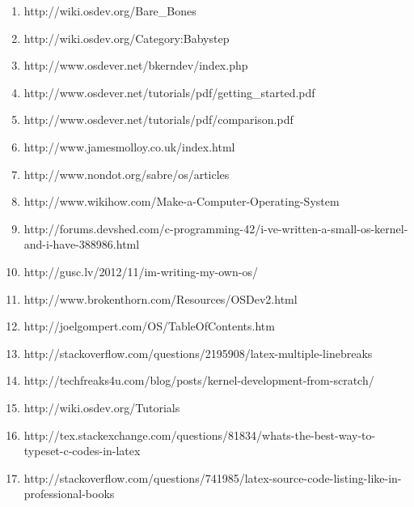 \documentclass[11pt]{article}
\begin{document}
 \begin{enumerate}
 
 \item  {http://wiki.osdev.org/Bare\_Bones}
 
 \item  {http://wiki.osdev.org/Category:Babystep}
 
  \item    {http://www.osdever.net/bkerndev/index.php}
  
  \item    {http://www.osdever.net/tutorials/pdf/getting\_started.pdf}
  
  \item    {http://www.osdever.net/tutorials/pdf/comparison.pdf}
 
  \item    {http://www.jamesmolloy.co.uk/index.html} 
 
  \item    {http://www.nondot.org/sabre/os/articles} 
  
  \item    {http://www.wikihow.com/Make-a-Computer-Operating-System} 
  
  \item    {http://forums.devshed.com/c-programming-42/i-ve-written-a-small-os-kernel-and-i-have-388986.html}
   
  \item    {http://gusc.lv/2012/11/im-writing-my-own-os/} 
    
  \item    {http://www.brokenthorn.com/Resources/OSDev2.html} 
  
  \item   {http://joelgompert.com/OS/TableOfContents.htm}
  
  \item   {http://stackoverflow.com/questions/2195908/latex-multiple-linebreaks}
  
  \item  {http://techfreaks4u.com/blog/posts/kernel-development-from-scratch/}
  
  \item {http://wiki.osdev.org/Tutorials}
  
  \item  {http://tex.stackexchange.com/questions/81834/whats-the-best-way-to-typeset-c-codes-in-latex}
  
  \item  {http://stackoverflow.com/questions/741985/latex-source-code-listing-like-in-professional-books}
  

\end{enumerate}
\end{document}
